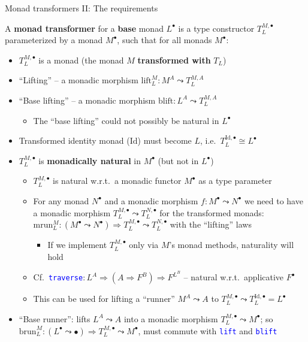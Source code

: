\documentclass[english]{beamer}
\begin{document}
\begin{frame}{Monad transformers II: The requirements}

{\footnotesize{}\vspace{-0.2cm}}A \textbf{monad transformer} for
a \textbf{base} monad $L^{\bullet}$ is a type constructor $T_{L}^{M,\bullet}$
parameterized by a monad $M^{\bullet}$, such that for all monads
$M^{\bullet}$:
\begin{itemize}
\item $T_{L}^{M,\bullet}$ is a monad (the monad $M$ \textbf{transformed
with} $T_{L}$)
\item ``Lifting'' -- a monadic morphism $\text{lift}_{L}^{M}:M^{A}\leadsto T_{L}^{M,A}$
\item ``Base lifting'' -- a monadic morphism $\text{blift}:L^{A}\leadsto T_{L}^{M,A}$
\begin{itemize}
\item The ``base lifting'' could not possibly be natural in $L^{\bullet}$
\end{itemize}
\item Transformed identity monad ($\text{Id}$) must become $L$, i.e.~$T_{L}^{\text{Id},\bullet}\cong L^{\bullet}$
\item $T_{L}^{M,\bullet}$ is \textbf{monadically natural} in $M^{\bullet}$
(but not in $L^{\bullet}$)
\begin{itemize}
\item $T_{L}^{M,\bullet}$ is natural w.r.t.~a monadic functor $M^{\bullet}$
as a type parameter
\item For any monad $N^{\bullet}$ and a monadic morphism $f:M^{\bullet}\leadsto N^{\bullet}$
we need to have a monadic morphism $T_{L}^{M,\bullet}\leadsto T_{L}^{N,\bullet}$
for the transformed monads: $\text{mrun}_{L}^{M}:\left(M^{\bullet}\leadsto N^{\bullet}\right)\Rightarrow T_{L}^{M,\bullet}\leadsto T_{L}^{N,\bullet}$
with the ``lifting'' laws
\begin{itemize}
\item If we implement $T_{L}^{M,\bullet}$ only via $M$'s monad methods,
naturality will hold 
\end{itemize}
\item Cf.~\texttt{\textcolor{blue}{\footnotesize{}traverse}}{\small{}$:L^{A}\Rightarrow(A\Rightarrow F^{B})\Rightarrow F^{L^{B}}$
-- natural w.r.t.~applicative $F^{\bullet}$}{\small\par}
\item This can be used for lifting a ``runner'' $M^{A}\leadsto A$ to
$T_{L}^{M,\bullet}\leadsto T_{L}^{\text{Id},\bullet}=L^{\bullet}$
\end{itemize}
\item ``Base runner'': lifts $L^{A}\leadsto A$ into a monadic morphism
$T_{L}^{M,\bullet}\leadsto M^{\bullet}$; so $\text{brun}_{L}^{M}:\left(L^{\bullet}\leadsto\bullet\right)\Rightarrow T_{L}^{M,\bullet}\leadsto M^{\bullet}$,
must commute with \texttt{\textcolor{blue}{\footnotesize{}lift}} and
\texttt{\textcolor{blue}{\footnotesize{}blift}} 
\end{itemize}
\end{frame}
\end{document}
